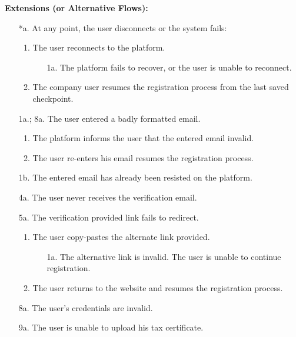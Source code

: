 \begin{itemize}[label={[\textbf{UC}]}, align=left, leftmargin=*]
    \textbf{Extensions (or Alternative Flows):} 
    \begin{enumerate}[label=\arabic*.]
        \item[*a.] At any point, the user disconnects or the system fails:
            \begin{enumerate}[label=\arabic*.]
                \item The user reconnects to the platform.
                    \begin{enumerate}[label=\alph*.]
                        \item[1a.] The platform fails to recover, or the user is unable to reconnect.
                    \end{enumerate}
                 \item The company user resumes the registration process from the last saved checkpoint.
            \end{enumerate}
        \item[1a.; 8a.] The user entered a badly formatted email.
            \begin{enumerate}[label=\arabic*.]
                \item The platform informs the user that the entered email invalid.
                \item The user re-enters his email resumes the registration process.
            \end{enumerate}
        \item[1b.] The entered email has already been resisted on the platform.
        \item[4a.] The user never receives the verification email.
        \item[5a.] The verification provided link fails to redirect.
            \begin{enumerate}[label=\arabic*.]
                \item The user copy-pastes the alternate link provided.
                    \begin{enumerate}[label=\alph*.]
                        \item[1a.] The alternative link is invalid. The user is unable to continue registration.
                    \end{enumerate}
                \item The user returns to the website and resumes the registration process.
            \end{enumerate}
        \item[8a.] The user's credentials are invalid.
        \item[9a.] The user is unable to upload his tax certificate.
    \end{enumerate}
     

\end{itemize}
